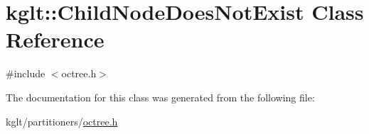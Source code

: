 \hypertarget{classkglt_1_1_child_node_does_not_exist}{\section{kglt\-:\-:Child\-Node\-Does\-Not\-Exist Class Reference}
\label{classkglt_1_1_child_node_does_not_exist}
}


{\ttfamily \#include $<$octree.\-h$>$}



The documentation for this class was generated from the following file\-:\begin{DoxyCompactItemize}
\item 
kglt/partitioners/\hyperlink{octree_8h}{octree.\-h}\end{DoxyCompactItemize}
